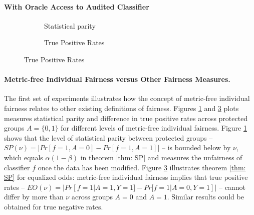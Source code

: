 \documentclass{article}
\begin{document}
\paragraph{With Oracle Access to Audited Classifier}
\begin{figure}
\begin{subfigure} {.5\linewidth}
\caption{Statistical parity}
\label{fig: 1a}
\end{subfigure}
\begin{subfigure} {.5\linewidth}
\caption{True Positive Rates}
\label{fig: 1b}
\end{subfigure}

\end{figure}

\paragraph{Metric-free Individual Fairness versus Other Fairness Measures.}
The first set of experiments illustrates how the concept of metric-free individual fairness relates to other existing definitions of fairness. Figures \ref{fig: 1a} and \ref{fig: 1b} plots measures statistical parity and  difference in true positive rates across protected groups $A=\{0, 1\}$ for different levels of metric-free individual fairness. Figure \ref{fig: 1a} shows that the level of statistical parity between protected groups -- $SP(\nu)=|Pr[f=1, A=0] - Pr[f=1, A=1]|$ -- is bounded below by $\nu$, which equals $\alpha(1-\beta)$ in theorem \ref{thm: SP} and measures the unfairness of classifier $f$ once the data has been modified. Figure \ref{fig: 1b} illustrates theorem \ref{thm: SP} for equalized odds: metric-free individual fairness implies that true positive rates -- $EO(\nu)= |Pr[f=1|A=1, Y=1] - Pr[f=1|A=0, Y=1]|$ -- cannot differ by more than $\nu$ across groups $A=0$ and $A=1$. Similar results could be obtained for true negative rates.
\end{document}
